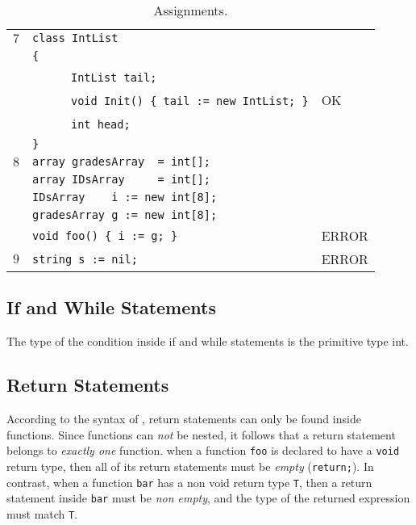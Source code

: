 \documentclass{article}
\begin{document}
\begin{table}[h]
\begin{tabular}{|l|l|l|}
 $7$ & \verb"class IntList"                               &    \\
     & \verb"{"                                           &    \\
     & ~ ~ ~ ~\verb"IntList tail;"                        &    \\
     & ~ ~ ~ ~\verb"void Init() { tail := new IntList; }" & OK \\
     & ~ ~ ~ ~\verb"int head;"                            &    \\
     & \verb"}"                                           &    \\
\hline
 $8$ & \verb"array gradesArray  = int[];"   &       \\
     & \verb"array IDsArray     = int[];"   &       \\
     & \verb"IDsArray    i := new int[8];" &       \\
     & \verb"gradesArray g := new int[8];" &       \\
     & \verb"void foo() { i := g; }"       & ERROR \\
\hline
 $9$ & \verb"string s := nil;" & ERROR \\
\hline
\end{tabular}
\caption{Assignments.
\label{Table_Code_Examples_Assignments}}
\end{table}
\subsection{If and While Statements}
\label{subsection_If_And_While_Statements}
The type of the condition inside if and while statements is the primitive type int.
\subsection{Return Statements}
\label{subsection_Return_Statements}
According to the syntax of \plname, return statements can only be found inside functions.
Since functions can \textit{not} be nested,
it follows that a return statement belongs to \textit{exactly one} function.
when a function \verb"foo" is declared to have a \verb"void" return type,
then all of its return statements must be \textit{empty} (\verb"return;").
In contrast, when a function \verb"bar" has a non void return type \verb"T",
then a return statement inside \verb"bar" must be \textit{non empty},
and the type of the returned expression must match \verb"T".
\end{document}
